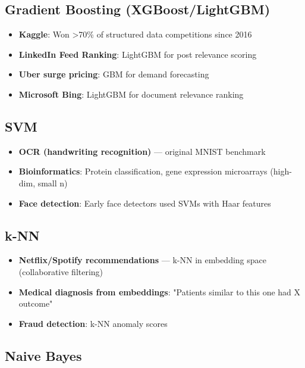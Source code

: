 \documentclass[11pt]{article}
\providecommand{\tightlist}{\setlength{\itemsep}{1pt}\setlength{\parskip}{0pt}}
\begin{document}
\subsection{Gradient Boosting (XGBoost/LightGBM)}\label{gradient-boosting-xgboostlightgbm}

\begin{itemize}
\tightlist
\item
  \textbf{Kaggle}: Won \textgreater70\% of structured data competitions since 2016
\item
  \textbf{LinkedIn Feed Ranking}: LightGBM for post relevance scoring
\item
  \textbf{Uber surge pricing}: GBM for demand forecasting
\item
  \textbf{Microsoft Bing}: LightGBM for document relevance ranking
\end{itemize}

\subsection{SVM}\label{svm}

\begin{itemize}
\tightlist
\item
  \textbf{OCR (handwriting recognition)} --- original MNIST benchmark
\item
  \textbf{Bioinformatics}: Protein classification, gene expression microarrays (high-dim, small n)
\item
  \textbf{Face detection}: Early face detectors used SVMs with Haar features
\end{itemize}

\subsection{k-NN}\label{k-nn}

\begin{itemize}
\tightlist
\item
  \textbf{Netflix/Spotify recommendations} --- k-NN in embedding space (collaborative filtering)
\item
  \textbf{Medical diagnosis from embeddings}: "Patients similar to this one had X outcome"
\item
  \textbf{Fraud detection}: k-NN anomaly scores
\end{itemize}

\subsection{Naive Bayes}\label{naive-bayes}
\end{document}
